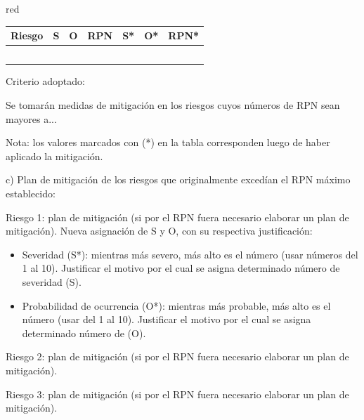 \documentclass[
    11pt, %
]{charter}
\begin{document}
\begin{consigna}{red}
        \begin{table}[htpb]
            \centering
            \begin{tabularx}{\linewidth}{@{}|X|c|c|c|c|c|c|@{}}
                \hline
                \rowcolor[HTML]{C0C0C0}
                Riesgo & S & O & RPN & S* & O* & RPN* \\ \hline
                &   &   &     &    &    &      \\ \hline
                &   &   &     &    &    &      \\ \hline
                &   &   &     &    &    &      \\ \hline
                &   &   &     &    &    &      \\ \hline
                &   &   &     &    &    &      \\ \hline
            \end{tabularx}%
        \end{table}

        Criterio adoptado:

        Se tomarán medidas de mitigación en los riesgos cuyos números de RPN sean mayores a...

        Nota: los valores marcados con (*) en la tabla corresponden luego de haber aplicado la mitigación.

        c) Plan de mitigación de los riesgos que originalmente excedían el RPN máximo establecido:

        Riesgo 1: plan de mitigación (si por el RPN fuera necesario elaborar un plan de mitigación).
        Nueva asignación de S y O, con su respectiva justificación:
        \begin{itemize}
            \item Severidad (S*): mientras más severo, más alto es el número (usar números del 1 al 10).
            Justificar el motivo por el cual se asigna determinado número de severidad (S).
            \item Probabilidad de ocurrencia (O*): mientras más probable, más alto es el número (usar del 1 al 10).
            Justificar el motivo por el cual se asigna determinado número de (O).
        \end{itemize}

        Riesgo 2: plan de mitigación (si por el RPN fuera necesario elaborar un plan de mitigación).

        Riesgo 3: plan de mitigación (si por el RPN fuera necesario elaborar un plan de mitigación).

    \end{consigna}
\end{document}
